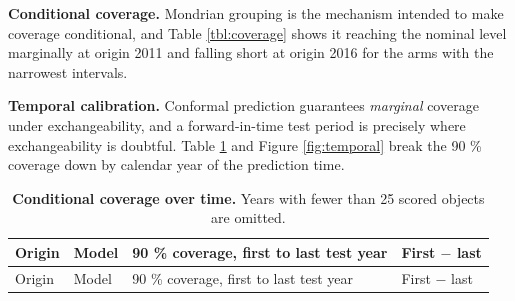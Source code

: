 \documentclass[3p,times]{elsarticle}
\begin{document}
\textbf{Conditional coverage.} Mondrian grouping is the mechanism
intended to make coverage conditional, and Table \ref{tbl:coverage}
shows it reaching the nominal level marginally at origin 2011 and
falling short at origin 2016 for the arms with the narrowest intervals.

\textbf{Temporal calibration.} Conformal prediction guarantees
\emph{marginal} coverage under exchangeability, and a forward-in-time
test period is precisely where exchangeability is doubtful. Table
\ref{tbl:temporal} and Figure \ref{fig:temporal} break the 90 \%
coverage down by calendar year of the prediction time.

\begin{longtable}[]{@{}
  >{\raggedright\arraybackslash}p{}
  >{\raggedright\arraybackslash}p{}
  >{\raggedright\arraybackslash}p{}
  >{\raggedleft\arraybackslash}p{}@{}}
\caption{\textbf{Conditional coverage over time.} Years with fewer than
25 scored objects are omitted.}\label{tbl:temporal}\tabularnewline
\toprule\noalign{}
\begin{minipage}[b]{\linewidth}\raggedright
Origin
\end{minipage} & \begin{minipage}[b]{\linewidth}\raggedright
Model
\end{minipage} & \begin{minipage}[b]{\linewidth}\raggedright
90 \% coverage, first to last test year
\end{minipage} & \begin{minipage}[b]{\linewidth}\raggedleft
First \(-\) last
\end{minipage} \\
\midrule\noalign{}
\endfirsthead
\toprule\noalign{}
\begin{minipage}[b]{\linewidth}\raggedright
Origin
\end{minipage} & \begin{minipage}[b]{\linewidth}\raggedright
Model
\end{minipage} & \begin{minipage}[b]{\linewidth}\raggedright
90 \% coverage, first to last test year
\end{minipage} & \begin{minipage}[b]{\linewidth}\raggedleft
First \(-\) last
\end{minipage} \\

\end{longtable}
\end{document}

